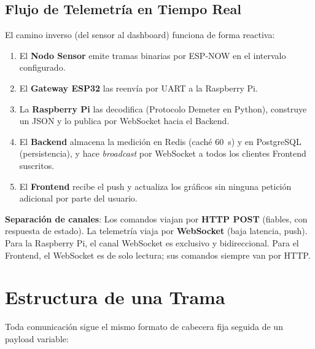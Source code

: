 \subsection{Flujo de Telemetría en Tiempo Real}

El camino inverso (del sensor al dashboard) funciona de forma reactiva:

\begin{enumerate}
    \item El \textbf{Nodo Sensor} emite tramas binarias por ESP-NOW en el intervalo configurado.
    \item El \textbf{Gateway ESP32} las reenvía por UART a la Raspberry Pi.
    \item La \textbf{Raspberry Pi} las decodifica (Protocolo Demeter en Python), construye un
          JSON y lo publica por WebSocket hacia el Backend.
    \item El \textbf{Backend} almacena la medición en Redis (caché 60~s) y en PostgreSQL
          (persistencia), y hace \textit{broadcast} por WebSocket a todos los clientes
          Frontend suscritos.
    \item El \textbf{Frontend} recibe el push y actualiza los gráficos sin ninguna petición
          adicional por parte del usuario.
\end{enumerate}

\begin{designnote}
\textbf{Separación de canales}: Los comandos viajan por \textbf{HTTP POST} (fiables, con
respuesta de estado). La telemetría viaja por \textbf{WebSocket} (baja latencia, push).
Para la Raspberry Pi, el canal WebSocket es exclusivo y bidireccional. Para el Frontend,
el WebSocket es de solo lectura; sus comandos siempre van por HTTP.
\end{designnote}

\section{Estructura de una Trama}

Toda comunicación sigue el mismo formato de cabecera fija seguida de un payload variable:

